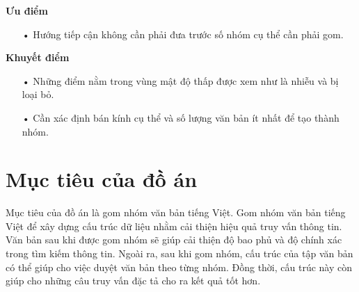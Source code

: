 \textbf{Ưu điểm}
\begin{enumerate}
\item[•]Hướng tiếp cận không cần phải đưa trước số nhóm cụ thể cần phải gom.
\end{enumerate}

\textbf{Khuyết điểm}
\begin{enumerate}
\item[•]Những điểm nằm trong vùng mật độ thấp được xem như là nhiễu và bị loại bỏ.
\item[•]Cần xác định bán kính cụ thể và số lượng văn bản ít nhất để tạo thành nhóm.
\end{enumerate}



\section{Mục tiêu của đồ án}
\label{sec:mtcda}
Mục tiêu của đồ án là gom nhóm văn bản tiếng Việt.
Gom nhóm văn bản tiếng Việt để xây dựng cấu trúc dữ liệu nhằm cải thiện hiệu quả truy vấn thông tin.
Văn bản sau khi được gom nhóm sẽ giúp cải thiện độ bao phủ và độ chính xác trong tìm kiếm thông tin.
Ngoài ra, sau khi gom nhóm, cấu trúc của tập văn bản có thể giúp cho việc duyệt văn bản theo từng nhóm.
Đồng thời, cấu trúc này còn giúp cho những câu truy vấn đặc tả cho ra kết quả tốt hơn.

